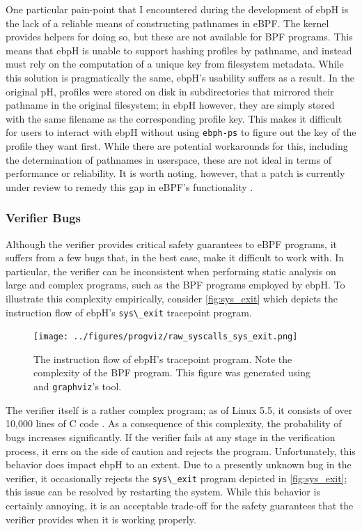 \documentclass[
  12pt]{findlay}
\newcommand{\passthrough}[1]{#1}
\begin{document}
One particular pain-point that I encountered during the development of
ebpH is the lack of a reliable means of constructing pathnames in eBPF.
The kernel provides helpers for doing so, but these are not available
for BPF programs. This means that ebpH is unable to support hashing
profiles by pathname, and instead must rely on the computation of a
unique key from filesystem metadata. While this solution is
pragmatically the same, ebpH's usability suffers as a result. In the
original pH, profiles were stored on disk in subdirectories that
mirrored their pathname in the original filesystem; in ebpH however,
they are simply stored with the same filename as the corresponding
profile key. This makes it difficult for users to interact with ebpH
without using \passthrough{\lstinline!ebph-ps!} to figure out the key of
the profile they want first. While there are potential workarounds for
this, including the determination of pathnames in userspace, these are
not ideal in terms of performance or reliability. It is worth noting,
however, that a patch is currently under review to remedy this gap in
eBPF's functionality \autocite{zhang19}.

\hypertarget{verifier-bugs}{%
\subsubsection{Verifier Bugs}\label{verifier-bugs}}

Although the verifier provides critical safety guarantees to eBPF
programs, it suffers from a few bugs that, in the best case, make it
difficult to work with. In particular, the verifier can be inconsistent
when performing static analysis on large and complex programs, such as
the BPF programs employed by ebpH. To illustrate this complexity
empirically, consider \autoref{fig:sys_exit} which depicts the
instruction flow of ebpH's \passthrough{\lstinline!sys\_exit!}
tracepoint program.

\begin{figure}
    \caption[The instruction flow of ebpH's  tracepoint program]{
        The instruction flow of ebpH's  tracepoint program.
        Note the complexity of the BPF program. This figure was generated using
         and \texttt{graphviz}'s  tool.
    }
    \label{fig:sys_exit}
    \texttt{[image: ../figures/progviz/raw\_syscalls\_sys\_exit.png]}
\end{figure}

The verifier itself is a rather complex program; as of Linux 5.5, it
consists of over 10,000 lines of C code \autocite{verifier_git}. As a
consequence of this complexity, the probability of bugs increases
significantly. If the verifier fails at any stage in the verification
process, it errs on the side of caution and rejects the program.
Unfortunately, this behavior does impact ebpH to an extent. Due to a
presently unknown bug in the verifier, it occasionally rejects the
\passthrough{\lstinline!sys\_exit!} program depicted in
\autoref{fig:sys_exit}; this issue can be resolved by restarting the
system. While this behavior is certainly annoying, it is an acceptable
trade-off for the safety guarantees that the verifier provides when it
is working properly.
\end{document}
